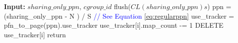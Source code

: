 \begin{algorithm}
\caption{Additional Action during Page Unmapping}
\label{alg:page-unmapping}
\begin{algorithmic}[1]
\STATE \textbf{Input:} $sharing\_only\_ppn$, $cgroup\_id$
\STATE flush($CL(sharing\_only\_ppn)s$)
\STATE ppn = (sharing\_only\_ppn - N ) / S \hfill \textcolor{blue} {// See Equation \ref{eq:regularppn}}
\STATE use\_tracker = pfn\_to\_page(ppn).use\_tracker
        \STATE use\_tracker[i].map\_count -= 1
            \STATE DELETE use\_tracker[i]
        \ENDIF
        \STATE return
    \ENDIF
\ENDFOR

\end{algorithmic}
\end{algorithm}
